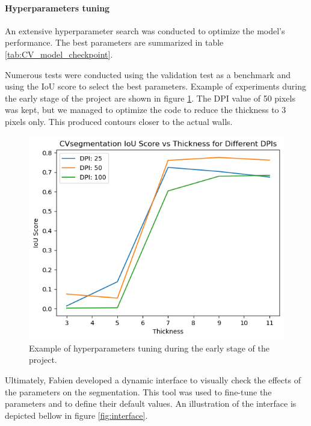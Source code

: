 \documentclass[11pt]{article}
\begin{document}
\paragraph{Hyperparameters tuning}
An extensive hyperparameter search was conducted to optimize the model's
performance. The best parameters are summarized in table \ref{tab:CV_model_checkpoint}.

Numerous tests were conducted using the validation test as a benchmark and using
the IoU score to select the best parameters. Example of experiments during the 
early stage of the project are shown in figure \ref{fig:hyperparameters_tuning}.
The DPI value of 50 pixels was kept, but we managed to optimize the code to 
reduce the thickness to 3 pixels only. This produced contours closer to the 
actual walls.

\begin{figure}[htb!]
    \centering
    \includegraphics[width=0.5\linewidth]{figures/CVsegmentation_score.png}
    \caption{Example of hyperparameters tuning during the
    early stage of the project.}
    \label{fig:hyperparameters_tuning}
\end{figure}

Ultimately, Fabien developed a dynamic interface to visually check the effects 
of the parameters on the segmentation. This tool was used to fine-tune the
parameters and to define their default values. An illustration of the interface 
is depicted bellow in figure \ref{fig:interface}.
\end{document}
